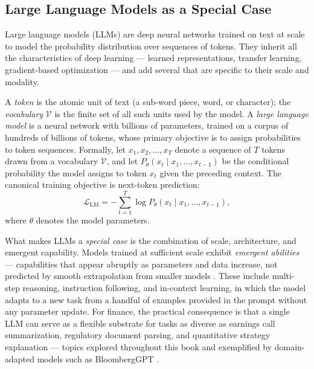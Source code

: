 \subsection{Large Language Models as a Special Case}
\label{subsec:llms-special-case}

Large language models (LLMs) are deep neural networks trained on text at
scale to model the probability distribution over sequences of tokens.
They inherit all the characteristics of deep learning --- learned
representations, transfer learning, gradient-based optimization --- and
add several that are specific to their scale and modality.

\begin{definition}
\label{def:llm}
A \emph{token} is the atomic unit of text (a sub-word piece, word, or character); the \emph{vocabulary} $\mathcal{V}$ is the finite set of all such units used by the model.
A \emph{large language model} is a neural network with billions of
parameters, trained on a corpus of hundreds of billions of tokens,
whose primary objective is to assign probabilities to token sequences.
Formally, let $x_1, x_2, \dots, x_T$ denote a sequence of $T$ tokens
drawn from a vocabulary $\mathcal{V}$, and let $P_\theta(x_t \mid x_1,
\dots, x_{t-1})$ be the conditional probability the model assigns to
token $x_t$ given the preceding context.  The canonical training
objective is next-token prediction:
\[
  \mathcal{L}_{\mathrm{LM}} = -\sum_{t=1}^{T} \log P_\theta(x_t \mid x_1, \dots, x_{t-1}),
\]
where $\theta$ denotes the model parameters.
\end{definition}

What makes LLMs a \emph{special case} is the combination of scale,
architecture, and emergent capability.  Models trained at sufficient
scale exhibit \emph{emergent abilities} --- capabilities that appear
abruptly as parameters and data increase, not predicted by smooth
extrapolation from smaller models \parencite{wei2022emergent}.  These include multi-step reasoning,
instruction following, and in-context learning, in which the model adapts
to a new task from a handful of examples provided in the prompt without
any parameter update.  For finance, the practical consequence is that a
single LLM can serve as a flexible substrate for tasks as diverse as
earnings call summarization, regulatory document parsing, and quantitative
strategy explanation --- topics explored throughout this book and
exemplified by domain-adapted models such as BloombergGPT
\parencite{wu2023bloomberggpt}.

